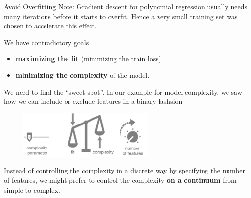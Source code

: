 \documentclass[11pt,compress,t,notes=noshow, xcolor=table]{beamer}
\begin{document}
\begin{vbframe}{Avoid Overfitting}
\footnotesize{Note: Gradient descent for polynomial regression usually needs many iterations before it starts to overfit. Hence a very small training set was chosen to accelerate this effect.}

\framebreak 

We have contradictory goals

\begin{itemize}
\item \textbf{maximizing the fit} (minimizing the train loss)
\item \textbf{minimizing the complexity} of the model.
\end{itemize}

We need to find the \enquote{sweet spot}. In our example for model complexity, we saw how we can include or exclude features in a binary fashsion.

\begin{center}
\begin{figure}
\includegraphics[width=0.6\textwidth]{figure_man/complexity-vs-fit2.png}
\end{figure}
\end{center}

Instead of controlling the complexity in a discrete way by specifying the number of features,
we might prefer to control the complexity  \textbf{on a continuum} from simple to complex.


\end{vbframe}

\end{document}

